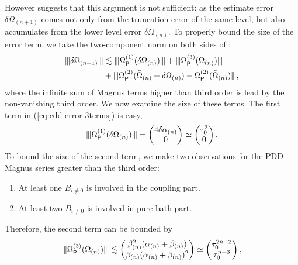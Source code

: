 \documentclass[aps,pra,reprint,superscriptaddress]{revtex4-2}
\newcommand{\Opdd}{\Omega_{\mathsf{P}}}
\begin{document}
However  suggests that this argument is not sufficient: as
the estimate error $\delta\Omega_{(n+1)}$ comes not only  from the truncation error of the same level, but also accumulates from the lower level error $\delta\Omega_{(n)}$. 
To properly bound the size of the error term, we take the two-component norm on both sides of :
\begin{equation}
\begin{aligned}\label{eq:cdd-error-3terms}
\opnorm{\delta\Omega_{(n+1)} }
&\lesssim \opnorm{ \Opdd\up{1}(\delta\Omega_{(n)}) } + 
\opnorm{\Opdd\up{3}( \Omega_{(n)})} \\
&+ \opnorm{ \Opdd\up{2}(\Ohat_{(n)}+\delta\Omega_{(n)})-\Opdd\up{2}(\Ohat_{(n)})},
\end{aligned}    
\end{equation}
where the infinite sum of Magnus terms higher than third order is lead by the non-vanishing third order. 
We now examine the size of these terms.
The first term in (\ref{eq:cdd-error-3terms}) is easy,
\begin{equation*}
\opnorm{\Opdd\up{1}(\delta\Omega_{(n)})} = \begin{pmatrix}
4 \delta\alpha_{(n)} \\
0
\end{pmatrix}\simeq
\begin{pmatrix}
\Dt^3 \\
0
\end{pmatrix}.
\end{equation*}
To bound the size of the second term, we make two observations for the PDD Magnus series greater than the third order:
\begin{enumerate}
    \item At least one $B_{i\neq0}$ is involved in the coupling part.
    \item At least two $B_{i\neq 0}$ is involved in pure bath part.  
\end{enumerate}
Therefore, the second term can be bounded by
\begin{equation*}
\opnorm{\Opdd\up{3}(\Omega_{(n)})} 
\lesssim\begin{pmatrix}
\beta_{(n)}^2 (\alpha_{(n)}+\beta_{(n)}) \\
\beta_{(n)} (\alpha_{(n)}+\beta_{(n)})^2
\end{pmatrix}
\simeq \begin{pmatrix}
\Dt^{2n+2}\\
\Dt^{n+3}
\end{pmatrix},
\end{equation*}
\end{document}
